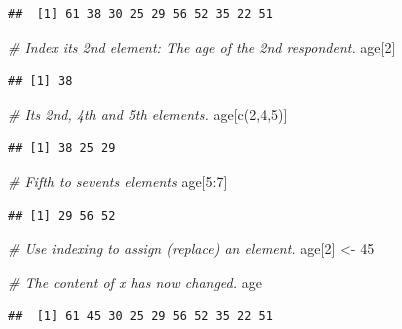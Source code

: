 \documentclass[
]{book}
\newenvironment{Shaded}{\begin{snugshade}}{\end{snugshade}}
\newcommand{\CommentTok}[1]{\textcolor[rgb]{0.56,0.35,0.01}{\textit{#1}}}
\newcommand{\DecValTok}[1]{\textcolor[rgb]{0.00,0.00,0.81}{#1}}
\newcommand{\FunctionTok}[1]{\textcolor[rgb]{0.00,0.00,0.00}{#1}}
\newcommand{\NormalTok}[1]{#1}
\newcommand{\OtherTok}[1]{\textcolor[rgb]{0.56,0.35,0.01}{#1}}
\newcommand{\SpecialCharTok}[1]{\textcolor[rgb]{0.00,0.00,0.00}{#1}}
\begin{document}
\begin{verbatim}
##  [1] 61 38 30 25 29 56 52 35 22 51
\end{verbatim}

\begin{Shaded}
\begin{Highlighting}[]
\CommentTok{\# Index its 2nd element: The age of the 2nd respondent.}
\NormalTok{age[}\DecValTok{2}\NormalTok{]}
\end{Highlighting}
\end{Shaded}

\begin{verbatim}
## [1] 38
\end{verbatim}

\begin{Shaded}
\begin{Highlighting}[]
\CommentTok{\# Its 2nd, 4th and 5th elements.}
\NormalTok{age[}\FunctionTok{c}\NormalTok{(}\DecValTok{2}\NormalTok{,}\DecValTok{4}\NormalTok{,}\DecValTok{5}\NormalTok{)]}
\end{Highlighting}
\end{Shaded}

\begin{verbatim}
## [1] 38 25 29
\end{verbatim}

\begin{Shaded}
\begin{Highlighting}[]
\CommentTok{\# Fifth to sevents elements}
\NormalTok{age[}\DecValTok{5}\SpecialCharTok{:}\DecValTok{7}\NormalTok{]}
\end{Highlighting}
\end{Shaded}

\begin{verbatim}
## [1] 29 56 52
\end{verbatim}

\begin{Shaded}
\begin{Highlighting}[]
\CommentTok{\# Use indexing to assign (replace) an element.}
\NormalTok{age[}\DecValTok{2}\NormalTok{] }\OtherTok{\textless{}{-}} \DecValTok{45}

\CommentTok{\# The content of x has now changed.}
\NormalTok{age}
\end{Highlighting}
\end{Shaded}

\begin{verbatim}
##  [1] 61 45 30 25 29 56 52 35 22 51
\end{verbatim}
\end{document}
